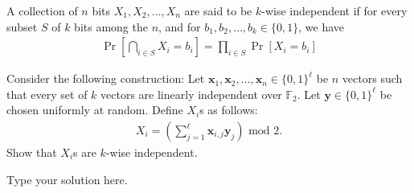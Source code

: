 \documentclass[addpoints,12pt]{exam}
\newcommand{\vect}[1]{\mathbf{#1}}
\newcommand{\F}{\mathbb{F}}
\begin{document}
\begin{questions}
           \question[5] A collection of $n$ bits $X_1, X_2, \ldots, X_n$ are
           said to be $k$-wise independent if for every subset $S$ of $k$ bits
           among the $n$, and for $b_1, b_2, \ldots, b_k \in \{0,1\}$, we have
           \begin{align*}
             \Pr\left[\bigcap_{i\in S} X_i = b_i\right] = \prod_{i\in S} \Pr\left[X_i = b_i \right]
           \end{align*}

           Consider the following construction: Let
           $\vect{x}_1, \vect{x}_2, \ldots, \vect{x}_n \in \{0,1\}^\ell$ be $n$
           vectors such that every set of $k$ vectors are linearly independent
           over $\F_2$. Let $\vect{y}\in \{0,1\}^\ell$ be chosen uniformly at
           random. Define $X_i$s as follows:
           \begin{align*}
             X_i = \left( \sum_{j=1}^\ell \vect{x}_{i,j}\vect{y}_j \right) \text{ mod $2$}.
           \end{align*}
           Show that $X_i$s are $k$-wise independent.
           \begin{solution}
               Type your solution here.
             \end{solution}
	\end{questions}
\end{document}
